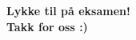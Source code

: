 \begin{frame}[plain]
    \begin{center}
        \begin{Large}
        \textbf{
            Lykke til på eksamen!\\[5mm]
            Takk for oss :)
        }
        \end{Large}
    \end{center}  
\end{frame}